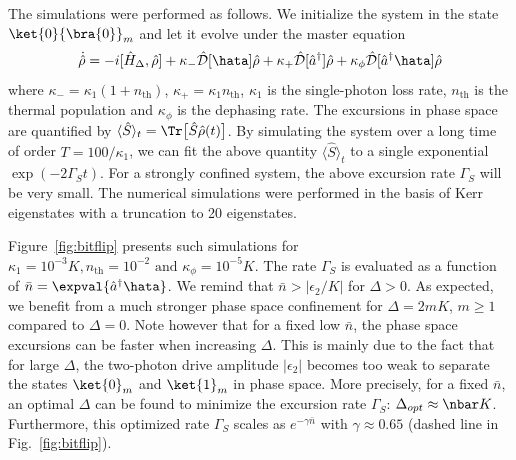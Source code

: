 The simulations were performed as follows. We initialize the system in the state $\ket{0}{\bra{0}}_m$ and let it evolve under the master equation 
\begin{equation}
    \dot{\hat\rho} = -i [\hat H_\Delta,\hat \rho] + \kappa_- \mathcal{\hat D}[\hata]\hat \rho + \kappa_+ \mathcal{\hat D}[\hat{a}^{\dagger}]\hat \rho + \kappa_\phi \mathcal{\hat D}[\hat{a}^{\dagger} \hata]\hat \rho
\end{equation}
where $\kappa_- = \kappa_1 (1 + n_{\text{th}})$, $\kappa_+ = \kappa_1 n_{\text{th}}$, $\kappa_1$ is the single-photon loss rate, $n_{\text{th}}$ is the thermal population and $\kappa_\phi$ is the dephasing rate. The excursions in phase space are quantified by $\langle \hat S \rangle_t = \Tr\bigl[\hat S\hat\rho(t)\bigr]$. By simulating the system over a long time of order $T=100/\kappa_1$, we can fit the above quantity $\langle \hat S\rangle_t$ to a single exponential $\exp(-2\Gamma_S t)$. For a strongly confined system, the above excursion rate $\Gamma_S$ will be very small.  The numerical simulations were performed in the basis of Kerr eigenstates with a truncation to 20 eigenstates.

Figure~\ref{fig:bitflip} presents such simulations for $\kappa_1 = 10^{-3}K,n_{\text{th}} = 10^{-2} \text{ and } \kappa_\phi = 10^{-5}K$. The rate $\Gamma_S$ is evaluated as a function of $\bar{n} = \expval{\hat{a}^{\dagger} \hata}$. We remind that $\bar{n} > |\epsilon_2/K|$ for $\Delta>0$. As expected, we benefit from a much stronger phase space confinement for $\Delta = 2mK$, $m \ge 1$ compared to $\Delta = 0$. Note however that for a fixed low $\bar{n}$, the phase space excursions can be faster when increasing $\Delta$. This is mainly due to the fact that for large $\Delta$, the two-photon drive amplitude $|\epsilon_2|$ becomes too weak to separate the states $\ket{0}_m$ and $\ket{1}_m$ in phase space.  More precisely, for a fixed $\bar{n}$, an optimal $\Delta$ can be found to minimize the excursion rate $\Gamma_S$: $\Delta_{opt} \approx \nbar K$. Furthermore, this optimized rate $\Gamma_S$ scales as $e^{-\gamma\bar{n}}$ with $\gamma \approx 0.65$ (dashed line in Fig.~\ref{fig:bitflip}).



